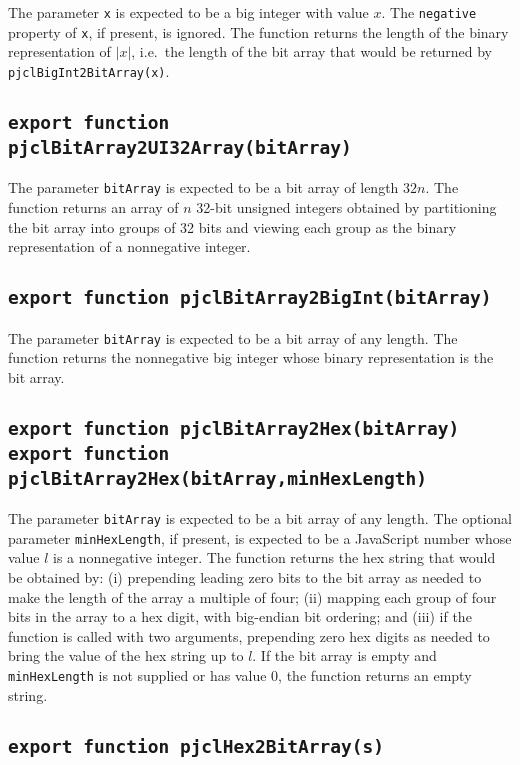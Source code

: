 \documentclass[12pt]{article}
\begin{document}
The parameter {\tt x} is expected to be a big integer with
value $x$.  
The {\tt negative} property of {\tt x}, if present, is ignored.
The function returns the length of the binary
representation of $|x|$, i.e.\ the length of the bit array that would be
returned by {\tt pjclBigInt2BitArray(x)}.

\subsection{\tt export function pjclBitArray2UI32Array(bitArray)}

The parameter {\tt bitArray} is expected to be a bit array of length
$32n$.  The function returns an array of $n$ 32-bit unsigned integers
obtained by partitioning the bit array into groups of 32 bits and
viewing each group as the binary representation of a nonnegative
integer.

\subsection{\tt export function pjclBitArray2BigInt(bitArray)}

The parameter {\tt bitArray} is expected to be a bit array of any length.  The
function returns the nonnegative big integer whose binary representation is the
bit array.

\subsection{\tt export function pjclBitArray2Hex(bitArray)\\export function pjclBitArray2Hex(bitArray,minHexLength)}

The parameter {\tt bitArray} is expected to be a bit array of any length.  
The optional parameter {\tt minHexLength}, if present, is expected to be a JavaScript
number whose value $l$ is a nonnegative integer.  The
function returns the hex string that would be obtained by: (i) prepending leading zero
bits to the bit array as needed to make the length of the array a
multiple of four; (ii) mapping each group of four bits in the array to a hex digit,
with big-endian bit ordering; and (iii) if the function is called with two arguments,
prepending zero hex digits as needed to bring the value of the hex string up to $l$.
If the bit array is empty and {\tt minHexLength} is not supplied or has value 0,
the function returns an empty string.

\subsection{\tt export function pjclHex2BitArray(s)}
\end{document}
